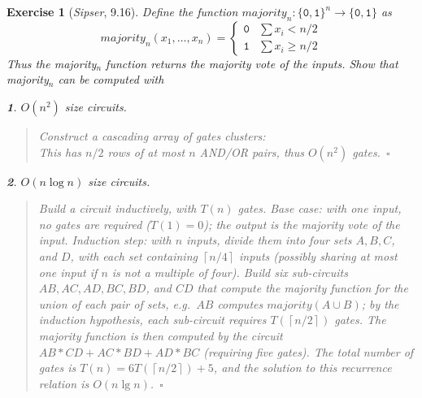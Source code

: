 \documentclass{article}
\theoremstyle{break}			%
\newtheorem{exercise}{Exercise}
\theoremstyle{plain}
\newtheorem{subexercise}{}[exercise]
\newenvironment{answer}{\begin{quotation}\noindent}{\end{quotation}}
\newcommand{\sipser}{\textit{Sipser}}
\newcommand{\qed}{~\ensuremath{\square}}
\newcommand{\sym}[1]{\ensuremath{\mathtt{#1}}}
\newcommand{\set}[1]{\ensuremath{\{#1\}}}
\newcommand{\enumlang}[1]{\set{\sym{#1}}}
\newcommand{\ceil}[1]{\ensuremath{\left\lceil#1\right\rceil}}
\begin{document}
\begin{exercise}[\sipser, 9.16]
Define the function
$\textit{majority}_n:\enumlang{0,1}^n\to\enumlang{0,1}$ as
\begin{displaymath}
\textit{majority}_n(x_1,\ldots,x_n)=\left\{
\begin{array}{ll}
\sym 0 & \sum x_i < n/2 \\
\sym 1 & \sum x_i \geq n/2
\end{array}
\right.
\end{displaymath}
Thus the \textit{majority}$_n$ function returns the majority vote of
the inputs.  Show that \textit{majority}$_n$ can be computed with
\begin{subexercise}
$O(n^2)$ size circuits.
\end{subexercise}
\begin{answer}
Construct a cascading array of gates clusters:
\vspace{2in}\\
This has $n/2$ rows of at most $n$ AND/OR pairs, thus $O(n^2)$
gates.\qed
\end{answer}

\begin{subexercise}
$O(n\log n)$ size circuits.
\end{subexercise}
\begin{answer}
Build a circuit inductively, with $T(n)$ gates.  Base case: with one
input, no gates are required ($T(1)=0$); the output is the majority
vote of the input.  Induction step: with $n$ inputs, divide them into
four sets $A, B, C$, and $D$, with each set containing $\ceil{n/4}$
inputs (possibly sharing at most one input if $n$ is not a multiple of
four).  Build six sub-circuits $AB, AC, AD, BC, BD$, and $CD$ that
compute the majority function for the union of each pair of sets,
e.g.~$AB$ computes $\textit{majority}(A\cup B)$; by the induction
hypothesis, each sub-circuit requires $T(\ceil{n/2})$ gates.  The
majority function is then computed by the circuit $AB*CD+AC*BD+AD*BC$
(requiring five gates).  The total number of gates is
$T(n)=6T(\ceil{n/2})+5$, and the solution to this recurrence relation
is $O(n\lg n)$.\qed
\end{answer}
\end{exercise}
\end{document}
